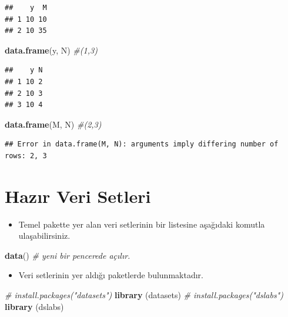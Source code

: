 \documentclass[
  oneside]{book}
\newenvironment{Shaded}{\begin{snugshade}}{\end{snugshade}}
\newcommand{\CommentTok}[1]{\textcolor[rgb]{0.56,0.35,0.01}{\textit{#1}}}
\newcommand{\FunctionTok}[1]{\textcolor[rgb]{0.13,0.29,0.53}{\textbf{#1}}}
\newcommand{\NormalTok}[1]{#1}
\providecommand{\tightlist}{%
  \setlength{\itemsep}{0pt}\setlength{\parskip}{0pt}}
\begin{document}
\begin{verbatim}
##    y  M
## 1 10 10
## 2 10 35
\end{verbatim}

\begin{Shaded}
\begin{Highlighting}[]
\FunctionTok{data.frame}\NormalTok{(y, N) }\CommentTok{\#(1,3)}
\end{Highlighting}
\end{Shaded}

\begin{verbatim}
##    y N
## 1 10 2
## 2 10 3
## 3 10 4
\end{verbatim}

\begin{Shaded}
\begin{Highlighting}[]
\FunctionTok{data.frame}\NormalTok{(M, N) }\CommentTok{\#(2,3)}
\end{Highlighting}
\end{Shaded}

\begin{verbatim}
## Error in data.frame(M, N): arguments imply differing number of rows: 2, 3
\end{verbatim}

\hypertarget{hazux131r-veri-setleri}{%
\section{Hazır Veri Setleri}\label{hazux131r-veri-setleri}}

\begin{itemize}
\tightlist
\item
  Temel pakette yer alan veri setlerinin bir listesine aşağıdaki komutla ulaşabilirsiniz.
\end{itemize}

\begin{Shaded}
\begin{Highlighting}[]
\FunctionTok{data}\NormalTok{() }\CommentTok{\# yeni bir pencerede açılır.}
\end{Highlighting}
\end{Shaded}

\begin{itemize}
\tightlist
\item
  Veri setlerinin yer aldığı paketlerde bulunmaktadır.
\end{itemize}

\begin{Shaded}
\begin{Highlighting}[]
\CommentTok{\# install.packages("datasets")}
\FunctionTok{library}\NormalTok{ (datasets)}
\CommentTok{\# install.packages("dslabs")}
\FunctionTok{library}\NormalTok{ (dslabs)}
\end{Highlighting}
\end{Shaded}
\end{document}

